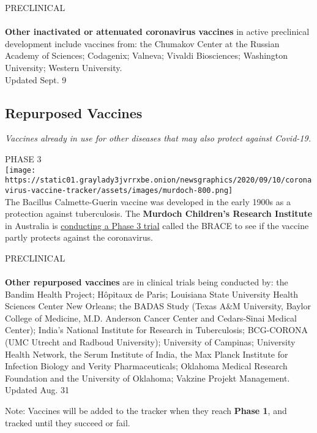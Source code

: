 PRECLINICAL\\
~\\
 \textbf{\textbf{Other inactivated or attenuated coronavirus vaccines}}
in active preclinical development include vaccines from: the Chumakov
Center at the Russian Academy of Sciences; Codagenix; Valneva; Vivaldi
Biosciences; Washington University; Western University.\\
Updated Sept. 9

\hypertarget{repurposed-vaccines}{%
\subsection{\texorpdfstring{\textbf{Repurposed
Vaccines}}{Repurposed Vaccines}}\label{repurposed-vaccines}}

\emph{Vaccines already in use for other diseases that may also protect
against Covid-19.}

PHASE 3\\
\texttt{[image: https://static01.graylady3jvrrxbe.onion/newsgraphics/2020/09/10/coronavirus-vaccine-tracker/assets/images/murdoch-800.png]}\\
The Bacillus Calmette-Guerin vaccine was developed in the early 1900s as
a protection against tuberculosis. The \textbf{\textbf{Murdoch
Children's Research Institute}} in Australia is
\href{https://www.nytimes3xbfgragh.onion/2020/04/03/health/coronavirus-bcg-vaccine.html}{conducting
a Phase 3 trial} called the BRACE to see if the vaccine partly protects
against the coronavirus.

PRECLINICAL\\
~\\
 \textbf{\textbf{Other repurposed vaccines}} are in clinical trials
being conducted by: the Bandim Health Project; Hôpitaux de Paris;
Louisiana State University Health Sciences Center New Orleans; the BADAS
Study (Texas A\&M University, Baylor College of Medicine, M.D. Anderson
Cancer Center and Cedars-Sinai Medical Center); India's National
Institute for Research in Tuberculosis; BCG-CORONA (UMC Utrecht and
Radboud University); University of Campinas; University Health Network,
the Serum Institute of India, the Max Planck Institute for Infection
Biology and Verity Pharmaceuticals; Oklahoma Medical Research Foundation
and the University of Oklahoma; Vakzine Projekt Management.\\
Updated Aug. 31

Note: Vaccines will be added to the tracker when they reach
\textbf{Phase 1}, and tracked until they succeed or fail.

